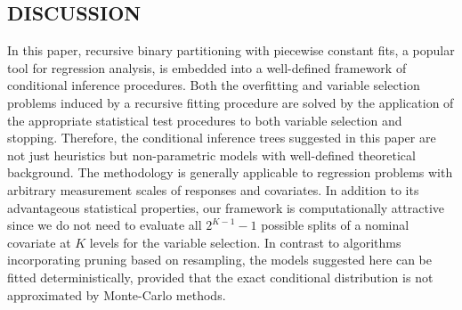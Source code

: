 
\begin{center}
\section{DISCUSSION}
\end{center}

In this paper, recursive binary partitioning with piecewise constant fits, 
a popular tool for regression analysis, is
embedded into a well-defined framework of conditional inference
procedures. Both the overfitting and variable selection problems induced by a
recursive fitting procedure are solved by the application of the 
appropriate statistical test procedures to both variable selection and
stopping. Therefore, the conditional inference trees suggested
in this paper are not just heuristics but non-parametric models with 
well-defined theoretical background. The methodology is generally applicable to
regression problems with arbitrary measurement scales of responses and
covariates.
In addition to its advantageous statistical properties, 
our framework is computationally attractive since we do not need to
evaluate all $2^{K-1} - 1$ possible splits of a nominal covariate at $K$
levels for the variable selection.
In contrast to algorithms incorporating pruning based on 
resampling, the models suggested here can be fitted deterministically, 
provided that the exact conditional distribution is not approximated by
Monte-Carlo methods. 


